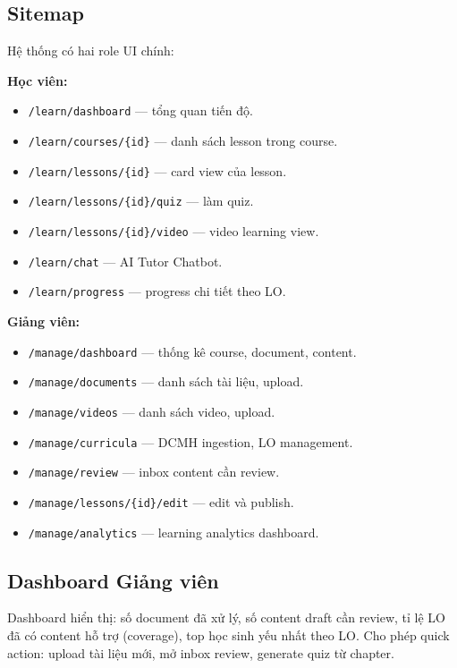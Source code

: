 \subsection{Sitemap}

Hệ thống có hai role UI chính:

\textbf{Học viên:}
\begin{itemize}
    \item \texttt{/learn/dashboard} --- tổng quan tiến độ.
    \item \texttt{/learn/courses/\{id\}} --- danh sách lesson trong course.
    \item \texttt{/learn/lessons/\{id\}} --- card view của lesson.
    \item \texttt{/learn/lessons/\{id\}/quiz} --- làm quiz.
    \item \texttt{/learn/lessons/\{id\}/video} --- video learning view.
    \item \texttt{/learn/chat} --- AI Tutor Chatbot.
    \item \texttt{/learn/progress} --- progress chi tiết theo LO.
\end{itemize}

\textbf{Giảng viên:}
\begin{itemize}
    \item \texttt{/manage/dashboard} --- thống kê course, document, content.
    \item \texttt{/manage/documents} --- danh sách tài liệu, upload.
    \item \texttt{/manage/videos} --- danh sách video, upload.
    \item \texttt{/manage/curricula} --- DCMH ingestion, LO management.
    \item \texttt{/manage/review} --- inbox content cần review.
    \item \texttt{/manage/lessons/\{id\}/edit} --- edit và publish.
    \item \texttt{/manage/analytics} --- learning analytics dashboard.
\end{itemize}

\subsection{Dashboard Giảng viên}

Dashboard hiển thị: số document đã xử lý, số content draft cần review, tỉ
lệ LO đã có content hỗ trợ (coverage), top học sinh yếu nhất theo LO. Cho
phép quick action: upload tài liệu mới, mở inbox review, generate quiz từ
chapter.

